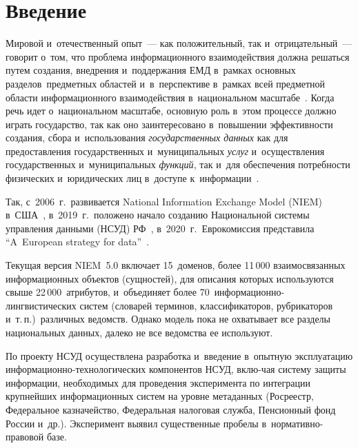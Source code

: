 \begin{multicols}{2}

\label{st\stat}

\section{Введение} %

Мировой и~отечественный опыт~--- как положительный, так 
и~отрицательный~--- говорит о~том, что проб\-ле\-ма информационного 
взаимодействия должна решаться путем создания, внед\-ре\-ния и~поддержания 
ЕМД в~рамках основных разделов~предметных областей 
и~в~перспективе в~рамках всей предметной области информационного 
взаимодействия в~национальном масштабе~\cite{1-suc}. Когда речь идет 
о~национальном масштабе, основную роль в~этом процессе должно играть 
государство, так как оно заинтересовано в~повышении эф\-фек\-тив\-ности 
создания, сбора и~использования \textit{государственных данных} как для 
предоставления государственных и~муниципальных \textit{услуг} 
и~осуществления государственных и~муниципальных \textit{функций}, так 
и~для обеспечения потребности физических и~юридических лиц в~доступе 
к~информации~\cite{2-suc}. 

Так, с~2006~г.\ развивается National Information 
Exchange Model (NIEM) в~США~\cite{3-suc}, в~2019~г.\ положено начало 
созданию Национальной сис\-те\-мы управ\-ле\-ния данными (НСУД)  
РФ~\cite{2-suc}, в~2020~г.\ Еврокомиссия представила ``A~European strategy 
for data''~\cite{4-suc}.

Текущая версия NIEM~5.0 включает 15~доменов, более 11\,000 
взаимосвязанных информационных объектов (сущностей), для описания 
которых используются свыше 22\,000~атрибутов, и~объединяет более  
70~ин\-фор\-ма\-ци\-он\-но-лин\-г\-вис\-ти\-че\-ских сис\-тем (словарей 
терминов, классификаторов, рубрикаторов и~т.\,п.)\ различных ведомств. 
Однако модель пока не охватывает все разделы национальных данных, 
далеко не все ведомства ее используют.

По проекту НСУД осуществлена разработка и~введение в~опытную 
эксплуатацию информа\-ци\-он\-но-тех\-но\-ло\-ги\-че\-ских компонентов 
НСУД, вклю-\linebreak чая систему защиты информации, необходимых для проведения 
эксперимента по интеграции крупнейших информационных сис\-тем на уровне 
метаданных (Росреестр, Федеральное \mbox{казначейство}, Федеральная налоговая служ\-ба, Пенсионный фонд 
России и~др.). Эксперимент выявил существенные пробелы 
в~нор\-ма\-тив\-но-пра\-во\-вой базе.


\end{multicols}
